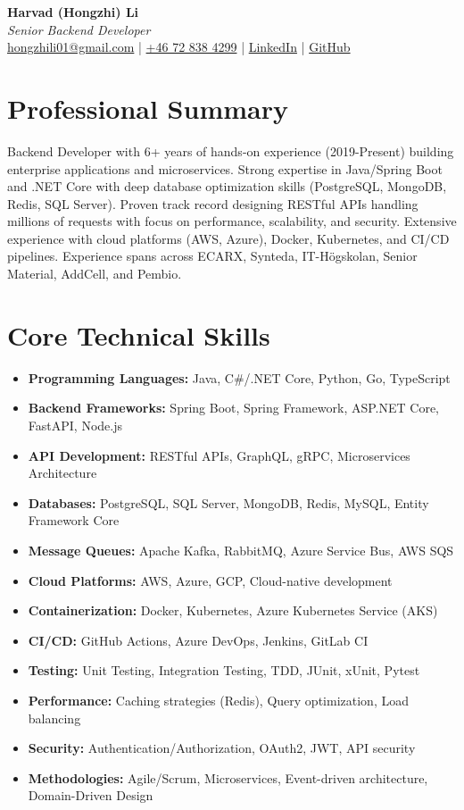 \documentclass[11pt,a4paper]{article}
\begin{document}
\begin{center}
{\LARGE \textbf{Harvad (Hongzhi) Li}}\\[10pt]
{\Large \textit{Senior Backend Developer}}\\[10pt]
\textcolor{titlecolor}{\href{mailto:hongzhili01@gmail.com}{hongzhili01@gmail.com} | \href{tel:+46728384299}{+46 72 838 4299} | \href{https://www.linkedin.com/in/harvad/}{LinkedIn} | \href{https://github.com/bluehawana}{GitHub}}
\end{center}

\vspace{8pt}

\section*{Professional Summary}
Backend Developer with 6+ years of hands-on experience (2019-Present) building enterprise applications and microservices. Strong expertise in Java/Spring Boot and .NET Core with deep database optimization skills (PostgreSQL, MongoDB, Redis, SQL Server). Proven track record designing RESTful APIs handling millions of requests with focus on performance, scalability, and security. Extensive experience with cloud platforms (AWS, Azure), Docker, Kubernetes, and CI/CD pipelines. Experience spans across ECARX, Synteda, IT-Högskolan, Senior Material, AddCell, and Pembio.

\section*{Core Technical Skills}
\begin{itemize}[noitemsep]
\item \textbf{Programming Languages:} Java, C\#/.NET Core, Python, Go, TypeScript
\item \textbf{Backend Frameworks:} Spring Boot, Spring Framework, ASP.NET Core, FastAPI, Node.js
\item \textbf{API Development:} RESTful APIs, GraphQL, gRPC, Microservices Architecture
\item \textbf{Databases:} PostgreSQL, SQL Server, MongoDB, Redis, MySQL, Entity Framework Core
\item \textbf{Message Queues:} Apache Kafka, RabbitMQ, Azure Service Bus, AWS SQS
\item \textbf{Cloud Platforms:} AWS, Azure, GCP, Cloud-native development
\item \textbf{Containerization:} Docker, Kubernetes, Azure Kubernetes Service (AKS)
\item \textbf{CI/CD:} GitHub Actions, Azure DevOps, Jenkins, GitLab CI
\item \textbf{Testing:} Unit Testing, Integration Testing, TDD, JUnit, xUnit, Pytest
\item \textbf{Performance:} Caching strategies (Redis), Query optimization, Load balancing
\item \textbf{Security:} Authentication/Authorization, OAuth2, JWT, API security
\item \textbf{Methodologies:} Agile/Scrum, Microservices, Event-driven architecture, Domain-Driven Design
\end{itemize}
\end{document}
